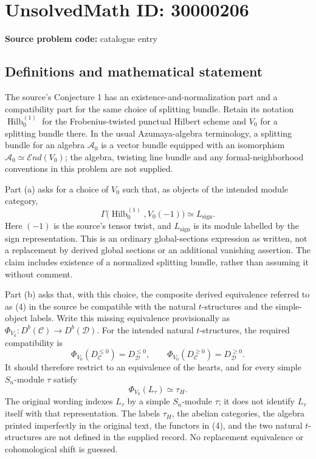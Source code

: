 \documentclass[11pt]{article}
\begin{document}
\section*{UnsolvedMath ID: 30000206}
\textbf{Source problem code:} catalogue entry
\subsection{Definitions and mathematical statement}
The source's Conjecture 1 has an existence-and-normalization part and a compatibility part for the same choice of splitting bundle. Retain its notation \(\operatorname{Hilb}^{(1)}_0\) for the Frobenius-twisted punctual Hilbert scheme and \(V_0\) for a splitting bundle there. In the usual Azumaya-algebra terminology, a splitting bundle for an algebra \(\mathcal A_0\) is a vector bundle equipped with an isomorphism \(\mathcal A_0\simeq\mathcal E nd(V_0)\); the algebra, twisting line bundle and any formal-neighborhood conventions in this problem are not supplied.

Part (a) asks for a choice of \(V_0\) such that, as objects of the intended module category,
\[
 \Gamma\bigl(\operatorname{Hilb}^{(1)}_0,V_0(-1)\bigr)
 \simeq L_{\mathrm{sign}}.
\]
Here \((-1)\) is the source's tensor twist, and \(L_{\mathrm{sign}}\) is its module labelled by the sign representation. This is an ordinary global-sections expression as written, not a replacement by derived global sections or an additional vanishing assertion. The claim includes existence of a normalized splitting bundle, rather than assuming it without comment.

Part (b) asks that, with this choice, the composite derived equivalence referred to as (4) in the source be compatible with the natural \(t\)-structures and the simple-object labels. Write this missing equivalence provisionally as \(\Phi_{V_0}:D^b(\mathcal C)\to D^b(\mathcal D)\). For the intended natural \(t\)-structures, the required compatibility is
\[
 \Phi_{V_0}(D^{\leq0}_{\mathcal C})=D^{\leq0}_{\mathcal D},\qquad
 \Phi_{V_0}(D^{\geq0}_{\mathcal C})=D^{\geq0}_{\mathcal D}.
\]
It should therefore restrict to an equivalence of the hearts, and for every simple \(S_n\)-module \(\tau\) satisfy
\[
 \Phi_{V_0}(L_\tau)\simeq\tau_H.
\]
The original wording indexes \(L_\tau\) by a simple \(S_n\)-module \(\tau\); it does not identify \(L_\tau\) itself with that representation. The labels \(\tau_H\), the abelian categories, the algebra printed imperfectly in the original text, the functors in (4), and the two natural \(t\)-structures are not defined in the supplied record. No replacement equivalence or cohomological shift is guessed.
\end{document}
